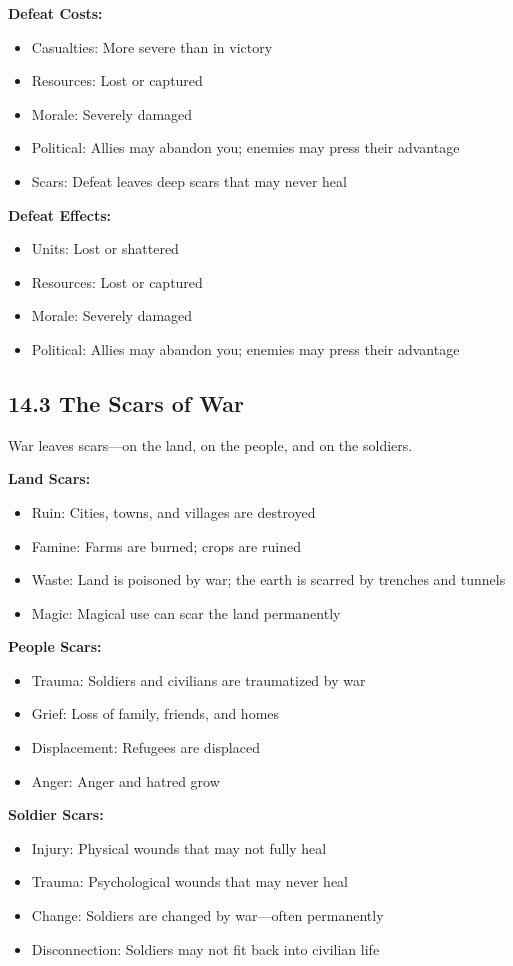 \documentclass[11pt]{article}
\begin{document}
\textbf{Defeat Costs:}
\begin{itemize}
  \item Casualties: More severe than in victory
  \item Resources: Lost or captured
  \item Morale: Severely damaged
  \item Political: Allies may abandon you; enemies may press their advantage
  \item Scars: Defeat leaves deep scars that may never heal
\end{itemize}

\textbf{Defeat Effects:}
\begin{itemize}
  \item Units: Lost or shattered
  \item Resources: Lost or captured
  \item Morale: Severely damaged
  \item Political: Allies may abandon you; enemies may press their advantage
\end{itemize}

\subsection{14.3 The Scars of War}

War leaves scars—on the land, on the people, and on the soldiers.

\textbf{Land Scars:}
\begin{itemize}
  \item Ruin: Cities, towns, and villages are destroyed
  \item Famine: Farms are burned; crops are ruined
  \item Waste: Land is poisoned by war; the earth is scarred by trenches and tunnels
  \item Magic: Magical use can scar the land permanently
\end{itemize}

\textbf{People Scars:}
\begin{itemize}
  \item Trauma: Soldiers and civilians are traumatized by war
  \item Grief: Loss of family, friends, and homes
  \item Displacement: Refugees are displaced
  \item Anger: Anger and hatred grow
\end{itemize}

\textbf{Soldier Scars:}
\begin{itemize}
  \item Injury: Physical wounds that may not fully heal
  \item Trauma: Psychological wounds that may never heal
  \item Change: Soldiers are changed by war—often permanently
  \item Disconnection: Soldiers may not fit back into civilian life
\end{itemize}
\end{document}
